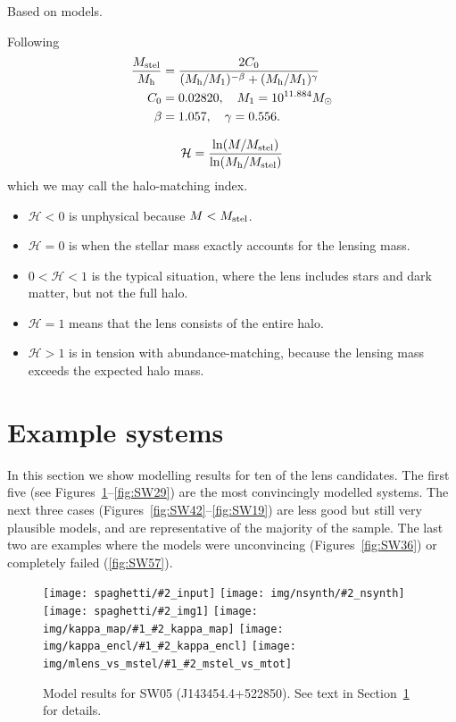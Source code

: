 \documentclass[fleqn,usenatbib]{mnras}
\newcommand{\inclfign}[2]{
  \centering
	\texttt{[image: spaghetti/\#2\_input]}%
	\texttt{[image: img/nsynth/\#2\_nsynth]}
	\texttt{[image: spaghetti/\#2\_img1]}%
        \texttt{[image: img/kappa\_map/\#1\_\#2\_kappa\_map]}
	\texttt{[image: img/kappa\_encl/\#1\_\#2\_kappa\_encl]}%
	\texttt{[image: img/mlens\_vs\_mstel/\#1\_\#2\_mstel\_vs\_mtot]}
}
\newcommand{\figref}[1]{\ref{fig:#1}}
\newcommand{\Mstel}{M_{\rm stel}}
\newcommand{\Mhalo}{M_{\rm h}}
\newcommand{\haloindex}{\mathcal{H}}
\begin{document}
Based on \cite{2003MNRAS.344.1000B} models.

Following \cite{2010ApJ...710..903M}
\begin{equation}
\begin{aligned}
\frac{\Mstel}{\Mhalo} &= \frac{2C_0}{(\Mhalo/M_1)^{-\beta} +
                                     (\Mhalo/M_1)^\gamma} \\
C_0 &= 0.02820, \quad M_1 = 10^{11.884} M_\odot \\
\beta &= 1.057, \quad \gamma = 0.556.
\end{aligned}
\end{equation}

\begin{equation}
\haloindex = \frac{\ln(M/\Mstel)}{\ln(\Mhalo/\Mstel)}
\end{equation}
which we may call the halo-matching index.
\begin{itemize}
\item $\haloindex < 0$ is unphysical because $M<\Mstel$.
\item $\haloindex = 0$ is when the stellar mass exactly accounts for the
  lensing mass.
\item $0 < \haloindex < 1$ is the typical situation, where the lens
  includes stars and dark matter, but not the full halo.
\item $\haloindex = 1$ means that the lens consists of the entire halo.
\item $\haloindex > 1$ is in tension with abundance-matching, because the
  lensing mass exceeds the expected halo mass.
\end{itemize}


\section{Example systems}\label{sec:examples}

In this section we show modelling results for ten of the lens
candidates.  The first five (see Figures~\figref{SW05}--\figref{SW29})
are the most convincingly modelled systems.  The next three cases
(Figures~\figref{SW42}--\figref{SW19}) are less good but still very
plausible models, and are representative of the majority of the
sample.  The last two are examples where the models were unconvincing
(Figures~\figref{SW36}) or completely failed (\figref{SW57}).

\begin{figure}
  \inclfign{SW05}{ASW0007k4r_N7LTELSYTM}
  \caption{Model results for SW05 (J143454.4+522850).  See text in
    Section~\ref{sec:examples} for details.}
  \label{fig:SW05}
\end{figure}
\end{document}
